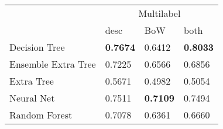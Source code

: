 \begin{tabular}{|l|l|l|l| }
\hline
 &  \multicolumn{3}{c|}{Multilabel} \\
\cline{2-4} & desc & BoW & both \\ \hline
Decision Tree       & {\bf 0.7674} & 0.6412 & {\bf 0.8033}\\
Ensemble Extra Tree & 0.7225 & 0.6566 & 0.6856\\
Extra Tree          & 0.5671 & 0.4982 & 0.5054\\
Neural Net          & 0.7511 & {\bf 0.7109} & 0.7494\\
Random Forest       & 0.7078 & 0.6361 & 0.6660\\
\hline
\end{tabular}